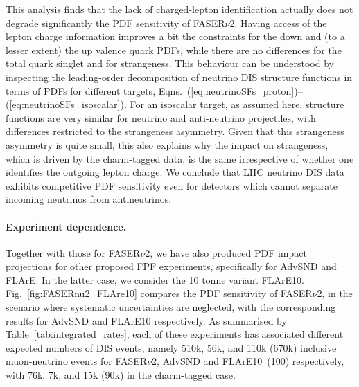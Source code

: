 This analysis finds that the lack of charged-lepton identification actually does not degrade significantly the PDF
sensitivity of FASER$\nu$2.
%
Having access of the lepton charge information improves a bit the constraints for the down and (to a lesser
extent) the up valence quark PDFs,  while there are no differences for the total quark
singlet and for strangeness.
%
This behaviour can be understood by inspecting the leading-order decomposition of neutrino DIS
structure functions in terms of PDFs for different targets, Eqns.~(\ref{eq:neutrinoSFs_proton})--(\ref{eq:neutrinoSFs_isoscalar}).
%
For an isoscalar target, as assumed here, structure functions are very similar for neutrino
and anti-neutrino projectiles, with differences restricted to the strangeness asymmetry.
%
Given that this strangeness asymmetry is quite small, this also explains why the impact
on strangeness, which is driven by the charm-tagged data, is the same irrespective of whether one identifies
the outgoing lepton charge.
%
We conclude that LHC neutrino DIS data exhibits competitive PDF sensitivity even for detectors which cannot
separate incoming neutrinos from antineutrinos.

\paragraph{Experiment dependence.}
%
Together with those for FASER$\nu$2, we have also produced PDF impact projections for
other proposed FPF experiments, specifically for AdvSND and FLArE.
%
In the latter case, we consider the 10 tonne variant FLArE10.
%
Fig.~\ref{fig:FASERnu2_FLAre10} compares the PDF sensitivity
of FASER$\nu$2, in the scenario where systematic uncertainties are neglected, with the corresponding
results for AdvSND and FLArE10 respectively.
%
As summarised by Table~\ref{tab:integrated_rates}, each of these experiments
has associated different expected numbers of DIS events, namely 510k, 56k, and 110k (670k)
inclusive muon-neutrino events for FASER$\nu$2, AdvSND and FLArE10~(100) respectively,
with 76k, 7k, and 15k (90k) in the charm-tagged case.

